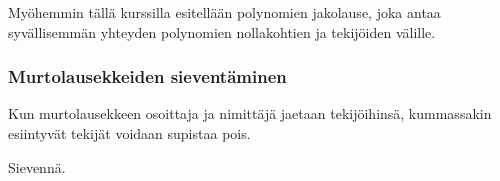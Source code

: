 Myöhemmin tällä kurssilla esitellään polynomien jakolause, joka antaa syvällisemmän yhteyden polynomien nollakohtien ja tekijöiden välille.

\subsubsection*{Murtolausekkeiden sieventäminen}

Kun murtolausekkeen osoittaja ja nimittäjä jaetaan tekijöihinsä, kummassakin esiintyvät tekijät voidaan supistaa pois.

\begin{esimerkki}
    Sievennä.
    \begin{esimratk}
    \end{esimratk}
    \begin{esimvast}
    \end{esimvast}
\end{esimerkki}